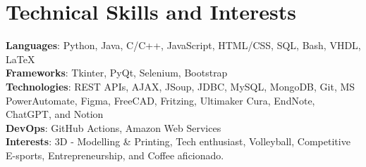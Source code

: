 \section{Technical Skills and Interests}
    \begin{itemize}[leftmargin=0.15in, label={}]
	\small{\item{
		\textbf{Languages}{: Python, Java, C/C++, JavaScript, HTML/CSS, SQL, Bash, VHDL, LaTeX} \\
		\textbf{Frameworks}{: Tkinter, PyQt, Selenium, Bootstrap} \\
		\textbf{Technologies}{: REST APIs, AJAX, JSoup, JDBC, MySQL, MongoDB, Git, MS PowerAutomate, Figma, FreeCAD, Fritzing, Ultimaker Cura, EndNote, ChatGPT, and Notion} \\
		\textbf{DevOps}{: GitHub Actions, Amazon Web Services} \\
        \textbf{Interests}{: 3D - Modelling \& Printing, Tech enthusiast, Volleyball, Competitive E-sports, Entrepreneurship, and Coffee aficionado.}
	}}
    \end{itemize}
